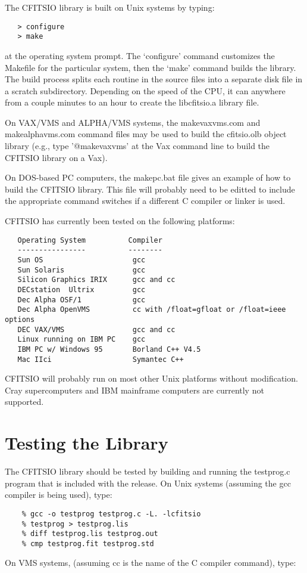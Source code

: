 The CFITSIO library is built on Unix systems by typing:

\begin{verbatim}
   > configure
   > make
\end{verbatim}
at the operating system prompt.  The `configure' command customizes
the Makefile for the particular system, then the `make' command
builds the library.  The build process splits each routine in the
source files into a separate disk file in a scratch subdirectory.
Depending on the speed of the CPU, it can anywhere from a couple
minutes to an hour to create the libcfitsio.a library file.

On VAX/VMS and ALPHA/VMS systems, the makevaxvms.com and makealphavms.com
command files may be used to build the cfitsio.olb object library
(e.g., type '@makevaxvms' at the Vax command line to build the CFITSIO
library on a Vax).

On DOS-based PC computers, the makepc.bat file gives an example
of how to build the CFITSIO library.  This file will probably
need to be editted to include the appropriate command switches
if a different C compiler or linker is used.

CFITSIO has currently been tested on the following platforms:

\begin{verbatim}
   Operating System          Compiler
   ----------------          --------
   Sun OS                     gcc
   Sun Solaris                gcc
   Silicon Graphics IRIX      gcc and cc
   DECstation  Ultrix         gcc
   Dec Alpha OSF/1            gcc
   Dec Alpha OpenVMS          cc with /float=gfloat or /float=ieee options
   DEC VAX/VMS                gcc and cc
   Linux running on IBM PC    gcc
   IBM PC w/ Windows 95       Borland C++ V4.5
   Mac IIci                   Symantec C++
\end{verbatim}
CFITSIO will probably run on most other Unix platforms without
modification.  Cray supercomputers and IBM mainframe computers are
currently not supported.


\section{Testing the Library}

The CFITSIO library should be tested by building and running
the testprog.c program that is included with the release.
On Unix systems (assuming the gcc compiler is being used), type:

\begin{verbatim}
    % gcc -o testprog testprog.c -L. -lcfitsio
    % testprog > testprog.lis
    % diff testprog.lis testprog.out
    % cmp testprog.fit testprog.std
\end{verbatim}
 On VMS systems,
(assuming cc is the name of the C compiler command), type:

